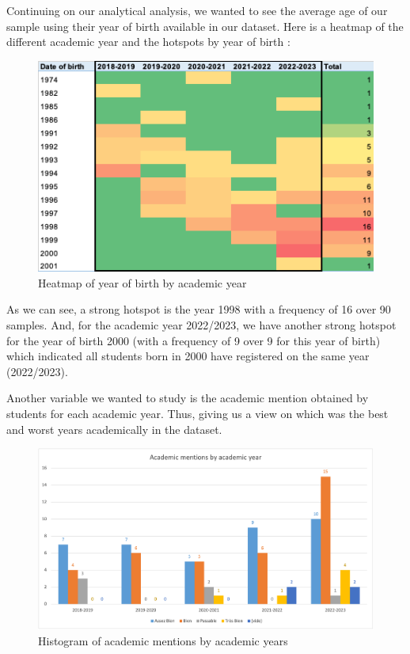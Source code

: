 \documentclass[../main.tex]{subfiles}
\begin{document}
Continuing on our analytical analysis, we wanted to see the average age of our sample using their year of birth available in our dataset. Here is a heatmap of the different academic year and the hotspots by year of birth : 
\begin{figure}      
    \includegraphics[width=1\linewidth]{res/graph/data_analysis/raw/heatymap_year.png}
    \caption{Heatmap of year of birth by academic year}
    \label{fig:heatmap_dob_acayear}
\end{figure}

As we can see, a strong hotspot is the year 1998 with a frequency of 16 over 90 samples. And, for the academic year 2022/2023, we have another strong hotspot for the year of birth 2000 (with a frequency of 9 over 9 for this year of birth) which indicated all students born in 2000 have registered on the same year (2022/2023).

Another variable we wanted to study is the academic mention obtained by students for each academic year. Thus, giving us a view on which was the best and worst years academically in the dataset.
\begin{figure}      
    \includegraphics[width=1\linewidth]{res/graph/data_analysis/raw/academicmentions_academic_year.png}
    \caption{Histogram of academic mentions by academic years}
    \label{fig:hist_acament_acayear}
\end{figure}
\end{document}
